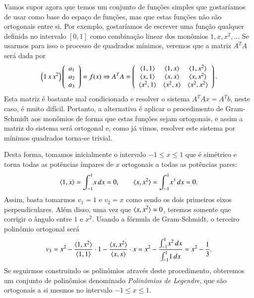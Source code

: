 Vamos supor agora que temos um conjunto de funções simples que gostaríamos de usar como base do espaço de funções, mas que estas funções não são ortogonais entre si. Por exemplo, gostaríamos de escrever uma função qualquer definida no intervalo $[0,1]$ como combinação linear dos monômios $1,x,x^2,\ldots$ Se usarmos para isso o processo de quadrados mínimos, veremos que a matriz $A^TA$ será dada por
\begin{equation*}
  \left( 1 \, x \, x^2 \right) \left(
    \begin{array}{c}
      a_1\\
      a_2\\
      a_3
    \end{array}
  \right) = f(x) \Rightarrow A^TA = \left( 
    \begin{array}{c c c}
      \langle 1, 1 \rangle & \langle 1, x \rangle & \langle 1, x^2 \rangle\\
      \langle x, 1 \rangle & \langle x, x \rangle & \langle x, x^2 \rangle\\
      \langle x^2, 1 \rangle & \langle x^2, x \rangle & \langle x^2, x^2 \rangle
    \end{array}
  \right).
\end{equation*}
Esta matriz é bastante mal condicionada e resolver o sistema $A^TAx=A^Tb$, neste caso, é muito difícil. Portanto, a alternativa é aplicar o procedimento de Gram-Schmidt aos monômios de forma que estas funções sejam ortogonais, e assim a matriz do sistema será ortogonal e, como já vimos, resolver este sistema por mínimos quadrados torna-se trivial.

Desta forma, tomamos inicialmente o intervalo $-1\leq x \leq 1$ que é simétrico e torna todas as potências ímpares de $x$ ortogonais a todas as potências pares:
\begin{equation*}
  \langle 1, x \rangle = \int_{-1}^1 \! x\, dx = 0, \qquad \langle x, x^2 \rangle = \int_{-1}^1 \! x^3\, dx = 0.
\end{equation*}
Assim, basta tomarmos $v_1=1$ e $v_2=x$ como sendo os dois primeiros eixos perpendiculares. Além disso, uma vez que $\langle x, x^2 \rangle=0$, teremos somente que corrigir o ângulo entre $1$ e $x^2$. Usando a fórmula de Gram-Schmidt, o terceiro polinômio ortogonal será
\begin{equation*}
  v_3 = x^2-\frac{\langle 1, x^2 \rangle}{\langle 1, 1 \rangle} \cdot 1- \frac{\langle x, x^2 \rangle}{\langle x, x \rangle} \cdot x = x^2 - \frac{\int_{-1}^1 \! x^2\, dx}{\int_{-1}^1 \! 1\, dx} = x^2-\frac{1}{3}.
\end{equation*}
Se seguirmos construindo os polinômios através deste procedimento, obteremos um conjunto de polinômios denominado \emph{Polinômios de Legendre}, que são ortogonais a si mesmos no intervalo $-1\leq x\leq 1$.